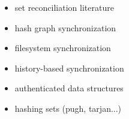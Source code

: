 
\begin{itemize}
  \item set reconciliation literature
  \item hash graph synchronization
  \item filesystem synchronization
  \item history-based synchronization
  \item authenticated data structures
  \item hashing sets (pugh, tarjan...)
\end{itemize}

%
%
%
